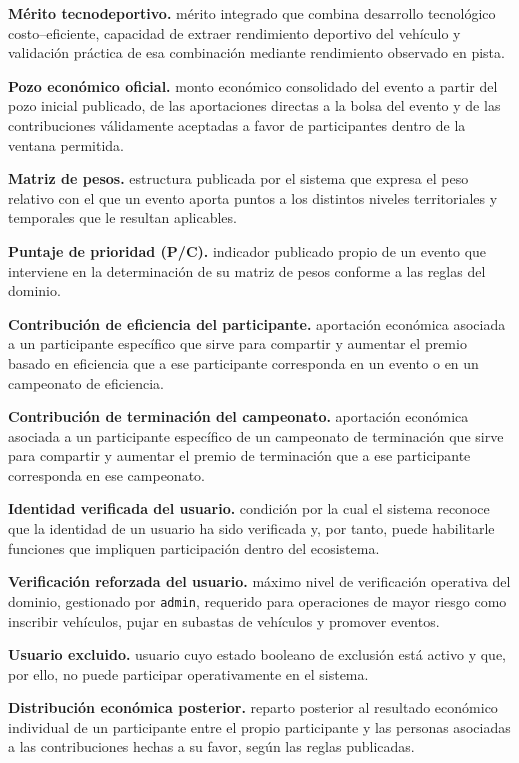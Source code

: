 \documentclass[10pt,letterpaper]{article}
\begin{document}
\noindent\textbf{Mérito tecnodeportivo.} mérito integrado que combina desarrollo tecnológico costo--eficiente, capacidad de extraer rendimiento deportivo del vehículo y validación práctica de esa combinación mediante rendimiento observado en pista.\par
\noindent\textbf{Pozo económico oficial.} monto económico consolidado del evento a partir del pozo inicial publicado, de las aportaciones directas a la bolsa del evento y de las contribuciones válidamente aceptadas a favor de participantes dentro de la ventana permitida.\par
\noindent\textbf{Matriz de pesos.} estructura publicada por el sistema que expresa el peso relativo con el que un evento aporta puntos a los distintos niveles territoriales y temporales que le resultan aplicables.\par
\noindent\textbf{Puntaje de prioridad (P/C).} indicador publicado propio de un evento que interviene en la determinación de su matriz de pesos conforme a las reglas del dominio.\par
\noindent\textbf{Contribución de eficiencia del participante.} aportación económica asociada a un participante específico que sirve para compartir y aumentar el premio basado en eficiencia que a ese participante corresponda en un evento o en un campeonato de eficiencia.\par
\noindent\textbf{Contribución de terminación del campeonato.} aportación económica asociada a un participante específico de un campeonato de terminación que sirve para compartir y aumentar el premio de terminación que a ese participante corresponda en ese campeonato.\par
\noindent\textbf{Identidad verificada del usuario.} condición por la cual el sistema reconoce que la identidad de un usuario ha sido verificada y, por tanto, puede habilitarle funciones que impliquen participación dentro del ecosistema.\par
\noindent\textbf{Verificación reforzada del usuario.} máximo nivel de verificación operativa del dominio, gestionado por \texttt{admin}, requerido para operaciones de mayor riesgo como inscribir vehículos, pujar en subastas de vehículos y promover eventos.\par
\noindent\textbf{Usuario excluido.} usuario cuyo estado booleano de exclusión está activo y que, por ello, no puede participar operativamente en el sistema.\par
\noindent\textbf{Distribución económica posterior.} reparto posterior al resultado económico individual de un participante entre el propio participante y las personas asociadas a las contribuciones hechas a su favor, según las reglas publicadas.\par
\end{document}
